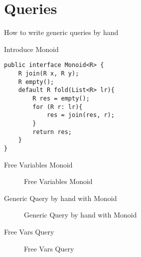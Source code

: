 \section{Queries}\label{sec:queries}

How to write generic queries by hand

Introduce Monoid
\begin{lstlisting}[numbers=none]
public interface Monoid<R> {
    R join(R x, R y);
    R empty();
    default R fold(List<R> lr){
    	R res = empty();
    	for (R r: lr){
    		res = join(res, r);
    	}
    	return res;
    }
}
\end{lstlisting}

Free Variables Monoid
\begin{figure}[tb]
\vspace{-.1in}
\caption{Free Variables Monoid}
\end{figure}


Generic Query by hand with Monoid
\begin{figure}[tb]
\vspace{-.1in}
\caption{Generic Query by hand with Monoid}
\end{figure}

Free Vars Query
\begin{figure}[tb]
\vspace{-.1in}
\caption{Free Vars Query}
\end{figure}
